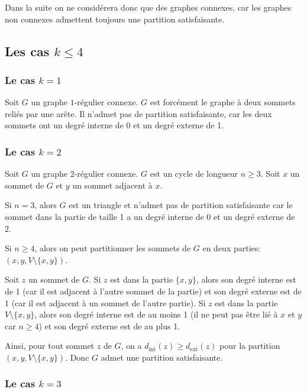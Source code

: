 Dans la suite on ne considérera donc que des graphes connexes, car les graphes non connexes admettent toujours une partition satisfaisante.

\subsection{Les cas \(k \leq 4\)}\label{subsec:ss2_2}

\subsubsection{Le cas \(k = 1\)}\label{subsubsec:ss2_2_1}

Soit \(G\) un graphe \(1\)-régulier connexe.
\(G\) est forcément le graphe à deux sommets reliés par une arête.
Il n'admet pas de partition satisfaisante, car les deux sommets ont un degré interne de 0 et un degré externe de 1.

\subsubsection{Le cas \(k = 2\)}\label{subsubsec:ss2_2_2}

Soit \(G\) un graphe \(2\)-régulier connexe.
\(G\) est un cycle de longueur \(n \geq 3\).
Soit \(x\) un sommet de \(G\) et \(y\) un sommet adjacent à \(x\).

Si \(n = 3\), alors \(G\) est un triangle et n'admet pas de partition satisfaisante car le sommet dans la partie de taille 1 a un degré interne de 0 et un degré externe de 2.

Si \(n \geq 4\), alors on peut partitionner les sommets de \(G\) en deux parties: \(({x, y}, V \setminus \{x, y\})\).

Soit \(z\) un sommet de \(G\).
Si \(z\) est dans la partie \(\{x, y\}\), alors son degré interne est de 1 (car il est adjacent à l'autre sommet de la partie) et son degré externe est de 1 (car il est adjacent à un sommet de l'autre partie).
Si \(z\) est dans la partie \(V \setminus \{x, y\}\), alors son degré interne est de au moins 1 (il ne peut pas être lié à \(x\) et \(y\) car \(n \geq 4\)) et son degré externe est de au plus 1.

Ainsi, pour tout sommet \(z\) de \(G\), on a \(d_{\mathrm{int}}(z) \geq d_{\mathrm{ext}}(z)\) pour la partition \(({x, y}, V \setminus \{x, y\})\).
Donc \(G\) admet une partition satisfaisante.

\subsubsection{Le cas \(k = 3\)}

